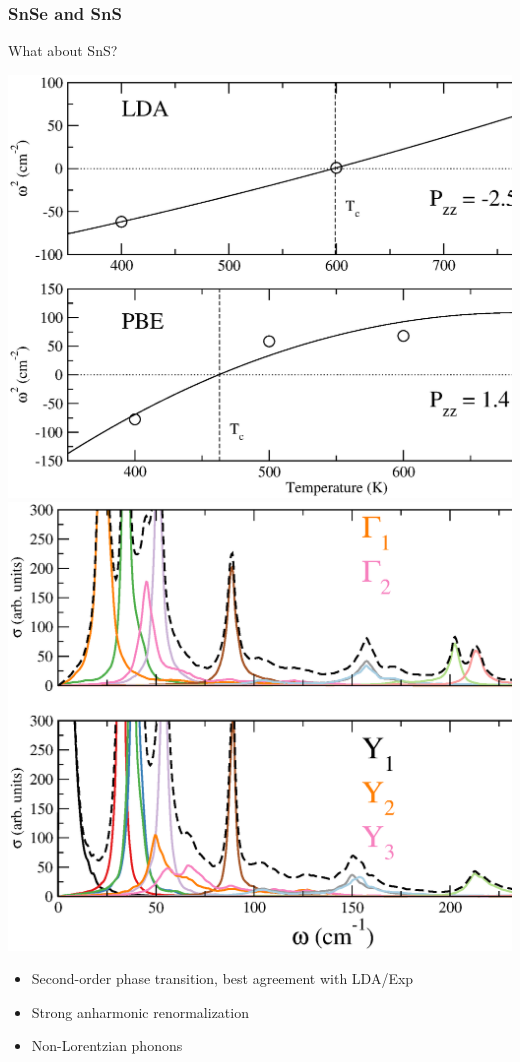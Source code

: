 \documentclass{beamer}
\begin{document}
\begin{frame}

\frametitle{SnSe and SnS}

What about SnS?
\begin{center}
 \includegraphics[width=0.43\linewidth]{Pictures/SnS/freq-sns.eps}
 \includegraphics[width=0.40\linewidth]{Pictures/SnS/spf-sns.eps}
\end{center}
\begin{itemize}
\item Second-order phase transition, best agreement with LDA/Exp
\item Strong anharmonic renormalization
\item Non-Lorentzian phonons
\end{itemize}

\end{frame}

\end{document}
